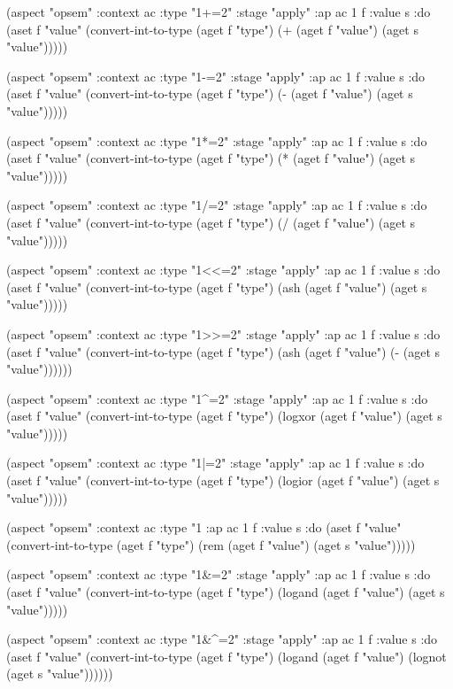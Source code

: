 \documentclass[12pt,twoside,russian]{article}
\begin{document}
\begin{ABMLCode}
(aspect "opsem" :context ac :type "1+=2" :stage "apply" 
  :ap ac 1 f :value s :do 
  (aset f "value" (convert-int-to-type (aget f "type") 
    (+ (aget f "value") (aget s "value")))))

(aspect "opsem" :context ac :type "1-=2" :stage "apply" 
  :ap ac 1 f :value s :do 
  (aset f "value" (convert-int-to-type (aget f "type") 
    (- (aget f "value") (aget s "value")))))

(aspect "opsem" :context ac :type "1*=2" :stage "apply" 
  :ap ac 1 f :value s :do 
  (aset f "value" (convert-int-to-type (aget f "type") 
    (* (aget f "value") (aget s "value")))))

(aspect "opsem" :context ac :type "1/=2" :stage "apply" 
  :ap ac 1 f :value s :do 
  (aset f "value" (convert-int-to-type (aget f "type") 
    (/ (aget f "value") (aget s "value")))))

(aspect "opsem" :context ac :type "1<<=2" :stage "apply" 
  :ap ac 1 f :value s :do 
  (aset f "value" (convert-int-to-type (aget f "type") 
    (ash (aget f "value") (aget s "value")))))

(aspect "opsem" :context ac :type "1>>=2" :stage "apply" 
  :ap ac 1 f :value s :do 
    (aset f "value" (convert-int-to-type (aget f "type") 
    (ash (aget f "value") (- (aget s "value"))))))

(aspect "opsem" :context ac :type "1^=2" :stage "apply" 
  :ap ac 1 f :value s :do 
  (aset f "value" (convert-int-to-type (aget f "type") 
    (logxor (aget f "value") (aget s "value")))))

(aspect "opsem" :context ac :type "1|=2" :stage "apply" 
  :ap ac 1 f :value s :do 
  (aset f "value" (convert-int-to-type (aget f "type") 
    (logior (aget f "value") (aget s "value")))))

(aspect "opsem" :context ac :type "1%
  :ap ac 1 f :value s :do 
  (aset f "value" (convert-int-to-type (aget f "type") 
  (rem (aget f "value") (aget s "value")))))

(aspect "opsem" :context ac :type "1&=2" :stage "apply" 
  :ap ac 1 f :value s :do 
  (aset f "value" (convert-int-to-type (aget f "type") 
  (logand (aget f "value") (aget s "value")))))

(aspect "opsem" :context ac :type "1&^=2" :stage "apply" 
  :ap ac 1 f :value s :do 
  (aset f "value" (convert-int-to-type (aget f "type") 
    (logand (aget f "value") (lognot (aget s "value"))))))
\end{ABMLCode}
\end{document}
